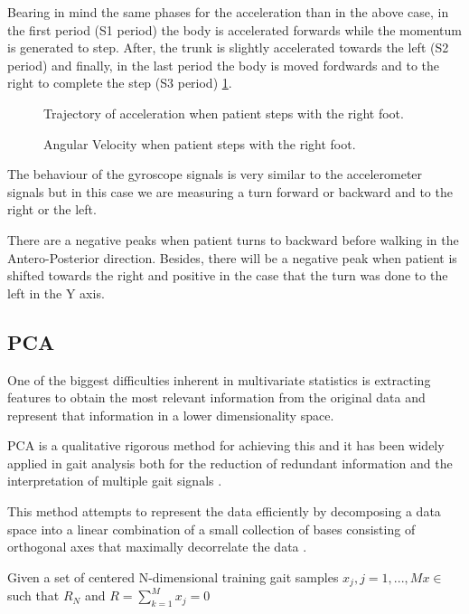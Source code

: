 Bearing in mind the same phases for the acceleration than in the above case, in the first period (S1 period) the body is accelerated forwards while the momentum is generated to step. After, the trunk is slightly accelerated towards the left (S2 period) and finally, in the last period the body is moved fordwards and to the right to complete the step (S3 period) \ref{fig:trajectoryAcc}.   
                 
\begin{figure}[H]
	\centering
	\caption{Trajectory of acceleration when patient steps with the right foot.}
	\label{fig:trajectoryAcc}
\end{figure} 
\begin{figure}[H]
	\centering
	\caption{Angular Velocity when patient steps with the right foot.}
	\label{fig:GyroTrunk}
\end{figure} 

The behaviour of the gyroscope signals is very similar to the accelerometer signals but in this case we are measuring a turn forward or backward and to the right or the left. 

There are a negative peaks when patient turns to backward before walking in the Antero-Posterior direction. Besides, there will be a negative peak when patient is shifted towards the right and positive in the case that the turn was done to the left in the Y axis.


\subsection{PCA}
One of the biggest difficulties inherent in multivariate statistics is extracting features to obtain the most relevant information from the original data and represent that information in a lower dimensionality space.

PCA is a qualitative rigorous method for achieving this and it has been widely applied in gait analysis both for the reduction of redundant information and the interpretation of multiple gait signals \cite{PCA}.

This method attempts to represent the data efficiently by decomposing a data space into a linear combination of a small collection of bases consisting of orthogonal axes that maximally decorrelate the data \cite{Jeon}.

Given a set of centered N-dimensional training gait samples 
$ x_{j}, j=1,...,M     x \in$ such that $ R_{N} $ and $ R=\sum_{k=1}^{M}x_{j}=0 $
	

